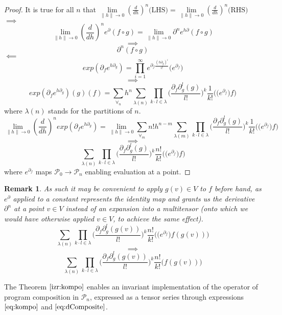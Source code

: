 \documentclass{article}
\newcommand{\dP}{\mathcal{P}}
\newcommand{\D}{\partial}
\newtheorem{opomba}{Remark}[section]
\begin{document}
\begin{proof}
 It is true for all $n$ that $\lim\limits_{\lVert h\rVert\to 0}(\frac{d}{dh})^n\text{(LHS)}=\lim\limits_{\lVert h\rVert\to 0}(\frac{d}{dh})^n\text{(RHS)}$\\
 $\implies$
 $$\lim\limits_{\lVert h\rVert\to 0}(\frac{d}{dh})^ne^\D(f\circ g)=\lim\limits_{\lVert h\rVert\to 0}\D^ne^{h\D}(f\circ g)$$
 $$\implies$$
 $$\D^n(f\circ g)$$
 $\impliedby$
 $$exp(\D_fe^{h\D_g})=\prod_{i=1}^{\infty}e^{\D_f\frac{(h\D_g)^i}{i!}}\Big(e^{\D_f}\Big)$$
 $$\implies$$
 $$exp(\D_fe^{h\D_g})(g)(f)=\sum\limits_{\forall_n}h^n\sum\limits_{\lambda(n)}\prod\limits_{k\cdot l\in\lambda}\Big(\frac{\D_f\D_g^l(g)}{l!}\Big)^k\frac{1}{k!}\Big(\Big(e^{\D_f}\Big)f\Big)$$
 where $\lambda(n)$ stands for the partitions of $n$.
 $$\lim\limits_{\lVert h\rVert\to 0}(\frac{d}{dh})^nexp(\D_fe^{h\D_g})=\lim\limits_{\lVert h\rVert\to 0}\sum\limits_{\forall_m}n!h^{n-m}\sum\limits_{\lambda(m)}\prod\limits_{k\cdot l\in\lambda}\Big(\frac{\D_f\D_g^l(g)}{l!}\Big)^k\frac{1}{k!}\Big(\Big(e^{\D_f}\Big)f\Big)$$
 $$\implies$$
 \begin{equation}\label{eq:dComposite}
 \sum\limits_{\lambda(n)}\prod\limits_{k\cdot l\in\lambda}\Big(\frac{\D_f\D_g^l(g)}{l!}\Big)^k\frac{n!}{k!}\Big(\Big(e^{\D_f}\Big)f\Big)
 \end{equation}
 where $e^{\D_f}$ maps $\dP_0\to\dP_n$ enabling evaluation at a point. 
 \end{proof}       
 \begin{opomba}
 As such it may be convenient to apply $g(v)\in V$ to $f$ before hand, as $e^\D$ applied to a constant represents the identity map and grants us the derivative $\D^n$ at a point $v\in V$ instead of an expansion into a multitensor (onto which we would have otherwise applied $v\in V$, to achieve the same effect).
  $$\sum\limits_{\lambda(n)}\prod\limits_{k\cdot l\in\lambda}\Big(\frac{\D_f\D_g^l(g(v))}{l!}\Big)^k\frac{n!}{k!}\Big(\Big(e^{\D_f}\Big)f(g(v))\Big)$$
  $$\implies$$
  \begin{equation}\label{eq:dCompositePoint}
  \sum\limits_{\lambda(n)}\prod\limits_{k\cdot l\in\lambda}\Big(\frac{\D_f\D_g^l(g(v))}{l!}\Big)^k\frac{n!}{k!}\Big(f(g(v))\Big)
  \end{equation}
 \end{opomba}
 The Theorem $\ref{izr:kompo}$ enables an invariant implementation of the operator of program composition in $\dP_n$, expressed as a tensor series through expressions $\eqref{eq:kompo}$ and $\eqref{eq:dComposite}$. 
 
\end{document}

